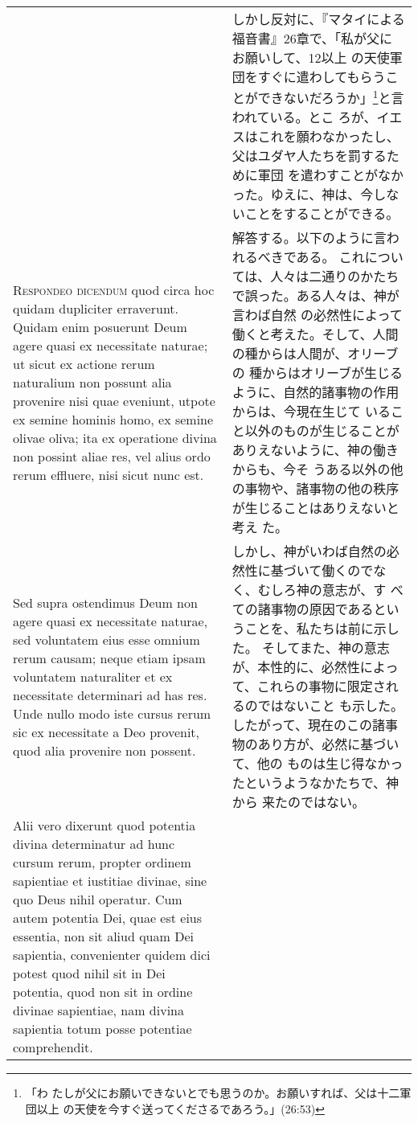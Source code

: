 \documentclass[10pt]{jsarticle} %
\begin{document}
\begin{longtable}{p{21em}p{21em}}
&

しかし反対に、『マタイによる福音書』26章で、「私が父にお願いして、12以上
の天使軍団をすぐに遣わしてもらうことができないだろうか」\footnote{「わ
たしが父にお願いできないとでも思うのか。お願いすれば、父は十二軍団以上
の天使を今すぐ送ってくださるであろう。」(26:53)}と言われている。とこ
ろが、イエスはこれを願わなかったし、父はユダヤ人たちを罰するために軍団
を遣わすことがなかった。ゆえに、神は、今しないことをすることができる。


\\


{\scshape Respondeo dicendum} quod circa hoc quidam
dupliciter erraverunt. Quidam enim posuerunt Deum agere quasi ex
necessitate naturae; ut sicut ex actione rerum naturalium non possunt
alia provenire nisi quae eveniunt, utpote ex semine hominis homo, ex
semine olivae oliva; ita ex operatione divina non possint aliae res, vel
alius ordo rerum effluere, nisi sicut nunc est. 


&

解答する。以下のように言われるべきである。
これについては、人々は二通りのかたちで誤った。ある人々は、神が言わば自然
の必然性によって働くと考えた。そして、人間の種からは人間が、オリーブの
種からはオリーブが生じるように、自然的諸事物の作用からは、今現在生じて
いること以外のものが生じることがありえないように、神の働きからも、今そ
うある以外の他の事物や、諸事物の他の秩序が生じることはありえないと考え
た。


\\


Sed supra ostendimus
Deum non agere quasi ex necessitate naturae, sed voluntatem eius esse
omnium rerum causam; neque etiam ipsam voluntatem naturaliter et ex
necessitate determinari ad has res. Unde nullo modo iste cursus rerum
sic ex necessitate a Deo provenit, quod alia provenire non possent. 



&

しかし、神がいわば自然の必然性に基づいて働くのでなく、むしろ神の意志が、す
 べての諸事物の原因であるということを、私たちは前に示した。
そしてまた、神の意志が、本性的に、必然性によって、これらの事物に限定されるのではないこと
 も示した。したがって、現在のこの諸事物のあり方が、必然に基づいて、他の
 ものは生じ得なかったというようなかたちで、神から
 来たのではない。

\\


Alii
vero dixerunt quod potentia divina determinatur ad hunc cursum rerum,
propter ordinem sapientiae et iustitiae divinae, sine quo Deus nihil
operatur. Cum autem potentia Dei, quae est eius essentia, non sit aliud
quam Dei sapientia, convenienter quidem dici potest quod nihil sit in
Dei potentia, quod non sit in ordine divinae sapientiae, nam divina
sapientia totum posse potentiae comprehendit. 



\end{longtable}
\end{document}
